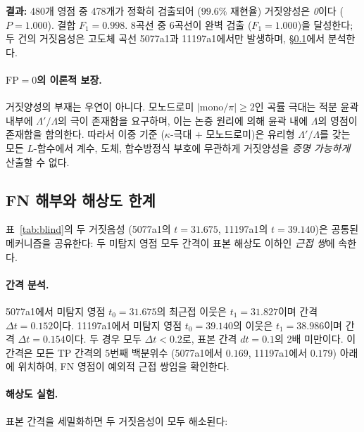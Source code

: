 \documentclass[11pt, a4paper]{article}
\theoremstyle{plain}
\theoremstyle{definition}
\begin{document}
\textbf{결과:} 480개 영점 중 478개가 정확히 검출되어
($99.6\%$ 재현율) 거짓양성은 \emph{0}이다 ($P=1.000$).
결합 $F_{1}=0.998$.  8곡선 중 6곡선이 완벽 검출
($F_{1}=1.000$)을 달성한다; 두 건의 거짓음성은
고도체 곡선 5077a1과 11197a1에서만 발생하며,
\S\ref{ssec:fnanatomy}에서 분석한다.

\paragraph{$\mathrm{FP}=0$의 이론적 보장.}
거짓양성의 부재는 우연이 아니다.
모노드로미 $|\mathrm{mono}/\pi| \geq 2$인 곡률 극대는
적분 윤곽 내부에 $\Lambda'/\Lambda$의 극이 존재함을 요구하며,
이는 논증 원리에 의해 윤곽 내에 $\Lambda$의 영점이 존재함을 함의한다.
따라서 이중 기준 ($\kappa$-극대 $+$ 모노드로미)은
유리형 $\Lambda'/\Lambda$를 갖는 모든 $L$-함수에서
계수, 도체, 함수방정식 부호에 무관하게
거짓양성을 \emph{증명 가능하게} 산출할 수 없다.


\subsection{FN 해부와 해상도 한계}
\label{ssec:fnanatomy}

표~\ref{tab:blind}의 두 거짓음성 (5077a1의 $t=31.675$,
11197a1의 $t=39.140$)은 공통된 메커니즘을 공유한다:
두 미탐지 영점 모두 간격이 표본 해상도 이하인
\emph{근접 쌍}에 속한다.

\paragraph{간격 분석.}
5077a1에서 미탐지 영점 $t_{0}=31.675$의 최근접 이웃은
$t_{1}=31.827$이며 간격 $\Delta t = 0.152$이다.
11197a1에서 미탐지 영점 $t_{0}=39.140$의 이웃은
$t_{1}=38.986$이며 간격 $\Delta t = 0.154$이다.
두 경우 모두 $\Delta t < 0.2$로, 표본 간격 $dt=0.1$의
2배 미만이다.  이 간격은 모든 TP 간격의
5번째 백분위수 (5077a1에서 $0.169$, 11197a1에서 $0.179$)
아래에 위치하여, FN 영점이 예외적 근접 쌍임을 확인한다.

\paragraph{해상도 실험.}
표본 간격을 세밀화하면 두 거짓음성이 모두 해소된다:
\end{document}
